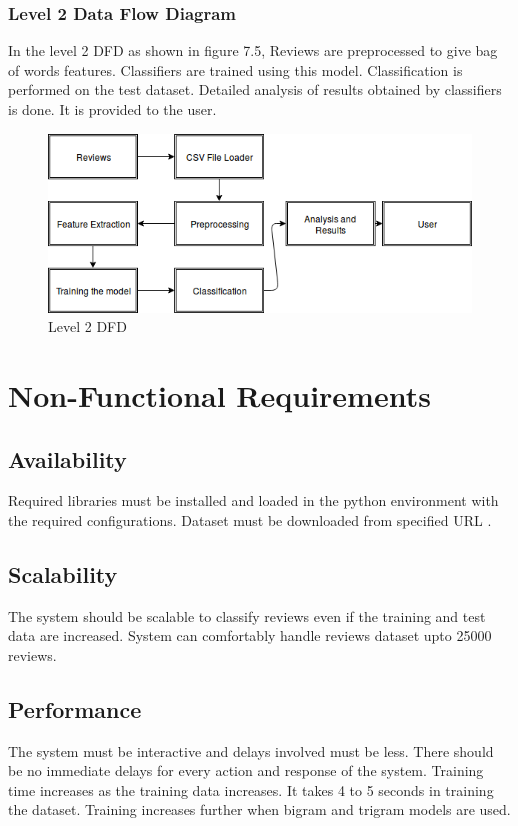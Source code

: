 \documentclass[oneside,a4paper,12pt]{pictreport}
\begin{document}
\subsubsection{Level 2 Data Flow Diagram}
In the level 2 DFD as shown in figure 7.5, Reviews are preprocessed to give bag of words features. Classifiers are trained using this model. Classification is 
performed on the test dataset. Detailed analysis of results obtained by classifiers is done. It is provided to the user.\\
\begin{figure}[h!]
\includegraphics[width=4.5in]{level_2.png}
\caption{Level 2 DFD}
\end{figure}




\section{Non-Functional Requirements}
\subsection{Availability}
Required libraries must be installed and loaded in the python environment with the 
required configurations. Dataset must be downloaded from specified URL \cite{dataset}.

\subsection{Scalability}
The system should be scalable to classify reviews even if the training and test data are increased. System can comfortably handle 
reviews dataset upto 25000 reviews.

\subsection{Performance}
The system must be interactive and delays involved must be less. There should be no immediate delays for every action and response of the system. Training time increases as the training data increases. It takes 4 to 5 seconds in training the dataset. Training increases further when bigram and trigram models are used.
\end{document}
